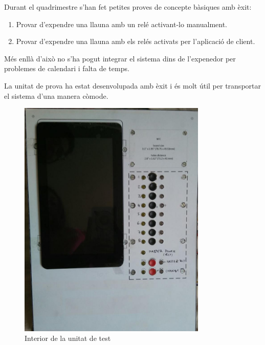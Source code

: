 Durant el quadrimestre s'han fet petites proves de concepte bàsiques amb èxit:
\begin{enumerate}
\item Provar d'expendre una llauna amb un relé activant-lo manualment.
\item Provar d'expendre una llauna amb els relés activats per l'aplicació de client.
\end{enumerate}

Més enllà d'això no s'ha pogut integrar el sistema dins de l'expenedor per problemes de calendari i falta de temps.

La unitat de prova ha estat desenvolupada amb èxit i és molt útil per transportar el sistema d'una manera còmode.


\begin{figure}
\center
\includegraphics[width=0.8\textwidth]{images/demonstrator_front}
\caption{Interior de la unitat de test}
\label{fig:demonstrator_diagram}
\end{figure}

